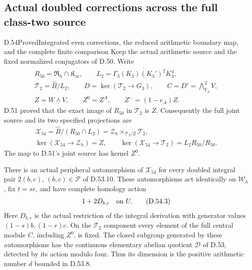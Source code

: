 \subsection{Actual doubled corrections across the full class-two source}

\begin{statement}{D.54}{Proved}{Integrated even corrections, the reduced arithmetic boundary map, and the complete finite comparison}
Keep the actual arithmetic source and the fixed normalized
conjugators of D.50. Write
\[
 \begin{gathered}
 R_{50}=\mathfrak R_h\cap\mathfrak K_\infty,\qquad
 L_2=\overline{\Gamma_3(K_3)(K_3')^2K_3^4},\\
 \mathcal T_2=\widehat B/L_2,\qquad
 D=\ker(\mathcal T_2\to G_3),\qquad
 C=D'=\bigwedge\nolimits^2_{\mathbb F_2}V,\\
 Z=W\wedge V,\qquad Z^0=Z^A,\qquad
 Z^-=(1-e_A)Z .
 \end{gathered}
 \tag{D.54.1}
\]
D.51 proved that the exact image of \(R_{50}\) in
\(\mathcal T_2\) is \(Z\).
Consequently the full joint source and its two
specified projections are
\[
 \begin{gathered}
 \mathcal X_{54}
   =\widehat B/(R_{50}\cap L_2)
   =\mathcal Z_h\times_{\mathcal T_2/Z}\mathcal T_2,\\
 \ker(\mathcal X_{54}\to\mathcal Z_h)=Z,\qquad
 \ker(\mathcal X_{54}\to\mathcal T_2)
       =L_2R_{50}/R_{50}.
 \end{gathered}
 \tag{D.54.2}
\]
The map to D.51's joint source has kernel \(Z^0\).

There is an actual peripheral automorphism of
\(\mathcal X_{54}\) for every doubled integral
pair \(2(b,c)\), \((b,c)\in\mathscr P\) of
D.53.10. These automorphisms act identically
on \(\mathcal W_h\), fix \(t=sr\), and have
complete homology action
\[
                  1+2D_{b,c}\quad\hbox{on }U .
 \tag{D.54.3}
\]
Here \(D_{b,c}\) is the actual restriction of
the integral derivation with generator values
\((1-s)b,(1-r)c\). On the \(\mathcal T_2\)
component every element of the full central
module \(C\), including \(Z^0\), is fixed.
The closed subgroup generated by these
automorphisms has the continuous elementary
abelian quotient \(\mathscr D\) of D.53,
detected by its action modulo four. Thus its
dimension is the positive arithmetic number
\(d\) bounded in D.53.8.


\end{statement}
